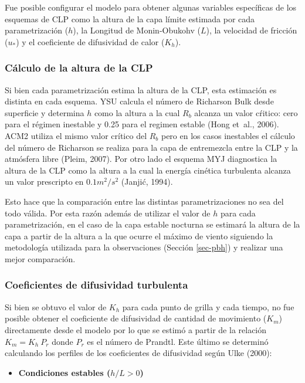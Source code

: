 \documentclass[12pt,spanish,oneside]{book}
\providecommand{\tightlist}{%
  \setlength{\itemsep}{0pt}\setlength{\parskip}{0pt}}
\begin{document}
Fue posible configurar el modelo para obtener algunas variables
específicas de los esquemas de CLP como la altura de la capa límite
estimada por cada parametrización (\(h\)), la Longitud de Monin-Obukohv
(\(L\)), la velocidad de fricción (\(u_*\)) y el coeficiente de
difusividad de calor (\(K_h\)).

\subsubsection{Cálculo de la altura de la
CLP}\label{calculo-de-la-altura-de-la-clp}

Si bien cada parametrización estima la altura de la CLP, esta estimación
es distinta en cada esquema. YSU calcula el número de Richarson Bulk
desde superficie y determina \(h\) como la altura a la cual \(R_b\)
alcanza un valor cŕitico: cero para el régimen inestable y 0.25 para el
regimen estable (Hong et~al., 2006). ACM2 utiliza el mismo valor crítico
del \(R_b\) pero en los casos inestables el cálculo del número de
Richarson se realiza para la capa de entremezcla entre la CLP y la
atmósfera libre (Pleim, 2007). Por otro lado el esquema MYJ diagnostica
la altura de la CLP como la altura a la cual la energía cinética
turbulenta alcanza un valor prescripto en \(0.1 m^2/s^2\) (Janjić,
1994).

Esto hace que la comparación entre las distintas parametrizaciones no
sea del todo válida. Por esta razón además de utilizar el valor de \(h\)
para cada parametrización, en el caso de la capa estable nocturna se
estimará la altura de la capa a partir de la altura a la que ocurre el
máximo de viento siguiendo la metodología utilizada para la
observaciones (Sección \ref{sec-pbh}) y realizar una mejor comparación.

\subsubsection{Coeficientes de difusividad
turbulenta}\label{coeficientes-de-difusividad-turbulenta}

Si bien se obtuvo el valor de \(K_h\) para cada punto de grilla y cada
tiempo, no fue posible obtener el coeficiente de difusividad de cantidad
de movimiento (\(K_m\)) directamente desde el modelo por lo que se
estimó a partir de la relación \(K_m = K_h \: P_r\) donde \(P_r\) es el
número de Prandtl. Este último se determinó calculando los perfiles de
los coeficientes de difusividad según Ulke (2000):

\begin{itemize}
\tightlist
\item
  \textbf{Condiciones estables (\(h/L > 0\))}
\end{itemize}
\end{document}
